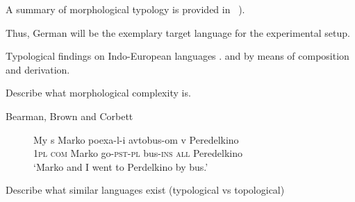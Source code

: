 A summary of morphological typology is provided in ~\cite*[78--93]{LINGUISTICTYPOLOGY}).


Thus, German will be the exemplary target language for the experimental setup.

Typological findings on Indo-European languages .
and by means of composition and derivation.





Describe what morphological complexity is.

Bearman, Brown and Corbett


\begin{figure}
    \label{fig:glossing}
\begin{exe}
\ex
\gll  My s Marko poexa-l-i avtobus-om v Peredelkino \\
1\textsc{pl} \textsc{com} Marko go-\textsc{pst}-\textsc{pl} bus-\textsc{ins} \textsc{all} Peredelkino \\
\glt  `Marko and I went to Perdelkino by bus.'
\end{exe}
\end{figure}



Describe what similar languages exist (typological vs topological)

